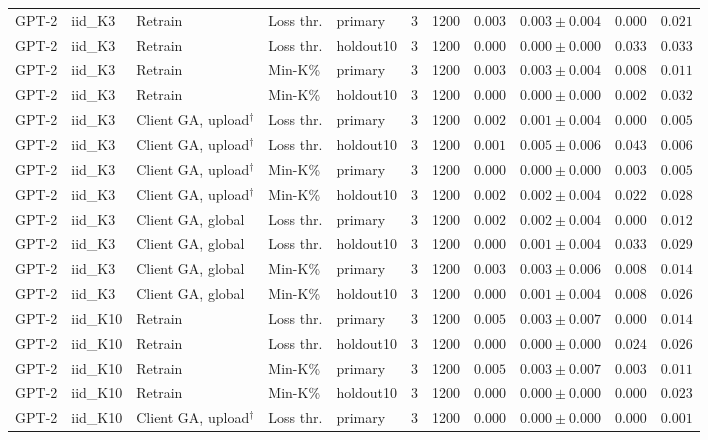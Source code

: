 \begin{table}[t]
\begin{tabular*}{\textwidth}{@{\extracolsep{\fill}}lllllcccccc@{}}
GPT-2 & iid\_K3 & Retrain & Loss thr. & primary & 3 & 1200 & $0.003$ & $0.003 \pm 0.004$ & $0.000$ & $0.021$ \\
GPT-2 & iid\_K3 & Retrain & Loss thr. & holdout10 & 3 & 1200 & $0.000$ & $0.000 \pm 0.000$ & $0.033$ & $0.033$ \\
GPT-2 & iid\_K3 & Retrain & Min-K\% & primary & 3 & 1200 & $0.003$ & $0.003 \pm 0.004$ & $0.008$ & $0.011$ \\
GPT-2 & iid\_K3 & Retrain & Min-K\% & holdout10 & 3 & 1200 & $0.000$ & $0.000 \pm 0.000$ & $0.002$ & $0.032$ \\
GPT-2 & iid\_K3 & Client GA, upload$^{\dagger}$ & Loss thr. & primary & 3 & 1200 & $0.002$ & $0.001 \pm 0.004$ & $0.000$ & $0.005$ \\
GPT-2 & iid\_K3 & Client GA, upload$^{\dagger}$ & Loss thr. & holdout10 & 3 & 1200 & $0.001$ & $0.005 \pm 0.006$ & $0.043$ & $0.006$ \\
GPT-2 & iid\_K3 & Client GA, upload$^{\dagger}$ & Min-K\% & primary & 3 & 1200 & $0.000$ & $0.000 \pm 0.000$ & $0.003$ & $0.005$ \\
GPT-2 & iid\_K3 & Client GA, upload$^{\dagger}$ & Min-K\% & holdout10 & 3 & 1200 & $0.002$ & $0.002 \pm 0.004$ & $0.022$ & $0.028$ \\
GPT-2 & iid\_K3 & Client GA, global & Loss thr. & primary & 3 & 1200 & $0.002$ & $0.002 \pm 0.004$ & $0.000$ & $0.012$ \\
GPT-2 & iid\_K3 & Client GA, global & Loss thr. & holdout10 & 3 & 1200 & $0.000$ & $0.001 \pm 0.004$ & $0.033$ & $0.029$ \\
GPT-2 & iid\_K3 & Client GA, global & Min-K\% & primary & 3 & 1200 & $0.003$ & $0.003 \pm 0.006$ & $0.008$ & $0.014$ \\
GPT-2 & iid\_K3 & Client GA, global & Min-K\% & holdout10 & 3 & 1200 & $0.000$ & $0.001 \pm 0.004$ & $0.008$ & $0.026$ \\
GPT-2 & iid\_K10 & Retrain & Loss thr. & primary & 3 & 1200 & $0.005$ & $0.003 \pm 0.007$ & $0.000$ & $0.014$ \\
GPT-2 & iid\_K10 & Retrain & Loss thr. & holdout10 & 3 & 1200 & $0.000$ & $0.000 \pm 0.000$ & $0.024$ & $0.026$ \\
GPT-2 & iid\_K10 & Retrain & Min-K\% & primary & 3 & 1200 & $0.005$ & $0.003 \pm 0.007$ & $0.003$ & $0.011$ \\
GPT-2 & iid\_K10 & Retrain & Min-K\% & holdout10 & 3 & 1200 & $0.000$ & $0.000 \pm 0.000$ & $0.000$ & $0.023$ \\
GPT-2 & iid\_K10 & Client GA, upload$^{\dagger}$ & Loss thr. & primary & 3 & 1200 & $0.000$ & $0.000 \pm 0.000$ & $0.000$ & $0.001$ \\

\end{tabular*}
\end{table}
